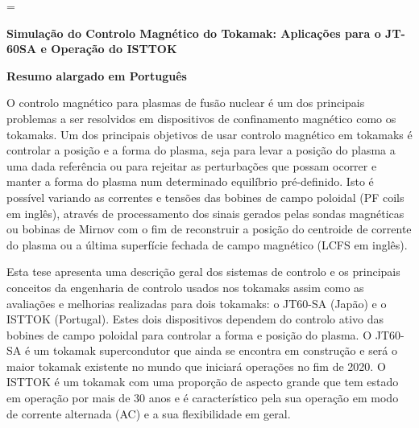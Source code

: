





\usepackage{enumitem}
\usepackage{notoccite}
\usepackage{longtable}
\usepackage{multirow}
\usepackage{lipsum}
\usepackage{xcolor,colortbl}
\usepackage{mathtools}

\DeclareMathOperator*{\argmin}{arg\,min}
\DeclareMathOperator{\dist}{\mathit{dist}}


	\emergencystretch=\maxdimen
	
	{\fontsize{12}{12}\selectfont \textbf{ Simulação do Controlo Magnético do Tokamak: Aplicações para o JT-60SA e Operação do ISTTOK}}
	
\medskip

\setlength{\parskip}{1em}

	
	\textbf{Resumo alargado em Português}
	\smallskip
	
O controlo magnético para  plasmas de fusão nuclear é um dos principais problemas a ser resolvidos em dispositivos de confinamento magnético como os tokamaks. Um dos principais objetivos de usar controlo magnético em tokamaks é controlar a posição e a forma do plasma, seja para levar a posição do plasma a uma dada referência ou para rejeitar as perturbações que possam  ocorrer e manter a forma do plasma num determinado equilíbrio pré-definido. Isto é possível variando as correntes e tensões das bobines de campo poloidal  (PF coils em inglês), através de processamento dos sinais gerados pelas sondas magnéticas ou bobinas de Mirnov com o fim de reconstruir a posição do centroide de corrente do plasma ou a última superfície fechada de campo magnético (LCFS em inglês).\smallskip

Esta tese apresenta  uma descrição geral dos sistemas de controlo e os principais conceitos da engenharia de controlo usados nos tokamaks assim como as avaliações e melhorias realizadas para dois tokamaks: o JT60-SA (Japão) e o ISTTOK (Portugal). Estes dois dispositivos dependem do controlo ativo das bobines de campo poloidal para controlar a forma e posição do plasma. O JT60-SA é um tokamak supercondutor que ainda se encontra em construção e será o maior tokamak existente no mundo que iniciará operações no fim de 2020. O ISTTOK é um tokamak com uma proporção de aspecto grande que tem estado em operação por mais de 30 anos e é característico pela sua operação em modo de corrente alternada (AC) e a sua flexibilidade em geral.\smallskip

